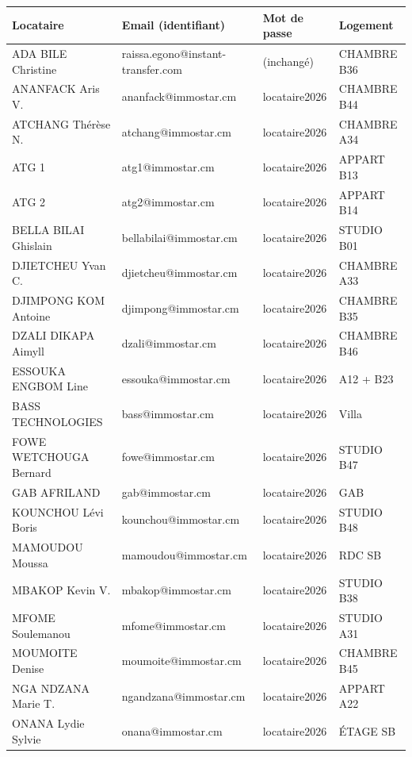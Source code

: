 \documentclass[a4paper,11pt]{article}
\begin{document}
\begin{longtable}{|p{4cm}|p{4.5cm}|p{3.5cm}|p{3cm}|}
\hline
\textbf{Locataire} & \textbf{Email (identifiant)} & \textbf{Mot de passe} & \textbf{Logement} \\
\hline
\endhead
ADA BILE Christine & raissa.egono@instant-transfer.com & (inchangé) & CHAMBRE B36 \\
\hline
ANANFACK Aris V. & ananfack@immostar.cm & locataire2026 & CHAMBRE B44 \\
\hline
ATCHANG Thérèse N. & atchang@immostar.cm & locataire2026 & CHAMBRE A34 \\
\hline
ATG 1 & atg1@immostar.cm & locataire2026 & APPART B13 \\
\hline
ATG 2 & atg2@immostar.cm & locataire2026 & APPART B14 \\
\hline
BELLA BILAI Ghislain & bellabilai@immostar.cm & locataire2026 & STUDIO B01 \\
\hline
DJIETCHEU Yvan C. & djietcheu@immostar.cm & locataire2026 & CHAMBRE A33 \\
\hline
DJIMPONG KOM Antoine & djimpong@immostar.cm & locataire2026 & CHAMBRE B35 \\
\hline
DZALI DIKAPA Aimyll & dzali@immostar.cm & locataire2026 & CHAMBRE B46 \\
\hline
ESSOUKA ENGBOM Line & essouka@immostar.cm & locataire2026 & A12 + B23 \\
\hline
BASS TECHNOLOGIES & bass@immostar.cm & locataire2026 & Villa \\
\hline
FOWE WETCHOUGA Bernard & fowe@immostar.cm & locataire2026 & STUDIO B47 \\
\hline
GAB AFRILAND & gab@immostar.cm & locataire2026 & GAB \\
\hline
KOUNCHOU Lévi Boris & kounchou@immostar.cm & locataire2026 & STUDIO B48 \\
\hline
MAMOUDOU Moussa & mamoudou@immostar.cm & locataire2026 & RDC SB \\
\hline
MBAKOP Kevin V. & mbakop@immostar.cm & locataire2026 & STUDIO B38 \\
\hline
MFOME Soulemanou & mfome@immostar.cm & locataire2026 & STUDIO A31 \\
\hline
MOUMOITE Denise & moumoite@immostar.cm & locataire2026 & CHAMBRE B45 \\
\hline
NGA NDZANA Marie T. & ngandzana@immostar.cm & locataire2026 & APPART A22 \\
\hline
ONANA Lydie Sylvie & onana@immostar.cm & locataire2026 & ÉTAGE SB \\
\hline

\end{longtable}
\end{document}
